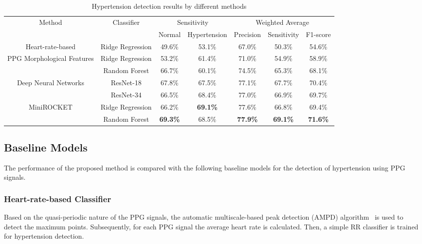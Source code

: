 \documentclass[letterpaper, 10 pt, conference]{ieeeconf}
\begin{document}
\bgroup
\def\arraystretch{1.4}\begin{table*}[t]
\centering
	\caption{Hypertension detection results by different methods}
			\begin{adjustbox}{width=0.8\textwidth}

	\begin{tabular}{c|c|cc|ccc}		
      \hline

		\hline
		\multirow{2}{*}{Method} &
		\multirow{2}{*}{Classifier} &		
		\multicolumn{2}{c|}{Sensitivity} &	\multicolumn{3}{c}{Weighted Average} \\
		& & Normal & Hypertension & Precision & Sensitivity & F1-score \\
		\hline
  		\multirow{1}{*}{Heart-rate-based} & Ridge Regression & 49.6\% & 53.1\% & 67.0\% & 50.3\% & 54.6\% \\
    \hline
		\multirow{2}{*}{PPG Morphological Features} & Ridge Regression & 53.2\% & 61.4\% & 71.0\% & 54.9\% & 58.9\% \\
		\cline{2-7}
		& Random Forest & 66.7\% & 60.1\% & 74.5\% & 65.3\% & 68.1\% \\	
		\hline
		\multirow{2}{*}{Deep Neural Networks} & ResNet-18 & 67.8\% & 67.5\% & 77.1\% & 67.7\% & 70.4\% \\
		\cline{2-7}
		& ResNet-34 & 66.5\% & 68.4\% & 77.0\% & 66.9\% & 69.7\% \\
	
  \hline
		\multirow{2}{*}{MiniROCKET} & Ridge Regression & 66.2\% & \textbf{69.1\%} & 77.6\% & 66.8\% & 69.4\% \\
\cline{2-7}
		& Random Forest & \textbf{69.3\%} & 68.5\% & \textbf{77.9\%} & \textbf{69.1\%} & \textbf{71.6\%} \\
\hline
	\end{tabular}
		\end{adjustbox}
\label{table:results}
\vspace{-2mm}
\end{table*}
\egroup


\subsection{Baseline Models}
The performance of the proposed method is compared with the following baseline models for the detection of hypertension using PPG signals.

\subsubsection{Heart-rate-based Classifier}
Based on the quasi-periodic nature of the PPG signals, the automatic multiscale-based peak detection (AMPD) algorithm~\cite{scholkmann2012efficient} is used to detect the maximum points. Subsequently, for each PPG signal the average heart rate is calculated. Then, a simple RR classifier is trained for hypertension detection. 
\end{document}
